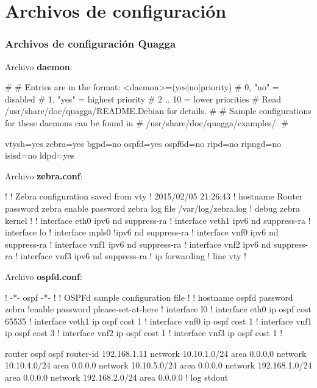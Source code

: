 
\chapter{Archivos de configuración}


\subsection{Archivos de configuraci\'on Quagga}

Archivo \textbf{daemon}:
\begin{bash}
#
# Entries are in the format: <daemon>=(yes|no|priority)
#   0, "no"  = disabled
#   1, "yes" = highest priority
#   2 .. 10  = lower priorities
# Read /usr/share/doc/quagga/README.Debian for details.
#
# Sample configurations for these daemons can be found in
# /usr/share/doc/quagga/examples/.
#

vtysh=yes
zebra=yes
bgpd=no
ospfd=yes
ospf6d=no
ripd=no
ripngd=no
isisd=no
ldpd=yes
\end{bash}

\newpage

Archivo \textbf{zebra.conf}:
\begin{bash}
!
! Zebra configuration saved from vty
!   2015/02/05 21:26:43
!
hostname Router
password zebra
enable password zebra
log file /var/log/zebra.log
!
debug zebra kernel
!
!
interface eth0
 ipv6 nd suppress-ra
!
interface veth1
 ipv6 nd suppress-ra
!
interface lo
!
interface mpls0
 !ipv6 nd suppress-ra
!
interface vnf0
 ipv6 nd suppress-ra
!
interface vnf1
 ipv6 nd suppress-ra
!
interface vnf2
 ipv6 nd suppress-ra
!
interface vnf3
 ipv6 nd suppress-ra
!
ip forwarding
!
line vty
!
\end{bash}

\newpage
Archivo \textbf{ospfd.conf}:
\begin{bash}
! -*- ospf -*-
!
! OSPFd sample configuration file
!
!
hostname ospfd
password zebra
!enable password please-set-at-here
!
interface l0
!
interface eth0
  ip ospf cost 65535
!
interface veth1
 ip ospf cost 1
!
interface vnf0
  ip ospf cost 1
!
interface vnf1
  ip ospf cost 3
!
interface vnf2
  ip ospf cost 1
!
interface vnf3
  ip ospf cost 1
!

router ospf
 ospf router-id 192.168.1.11
 network 10.10.1.0/24 area 0.0.0.0
 network 10.10.4.0/24 area 0.0.0.0
 network 10.10.5.0/24 area 0.0.0.0
 network 192.168.1.0/24 area 0.0.0.0
 network 192.168.2.0/24 area 0.0.0.0
!
log stdout

\end{bash}

